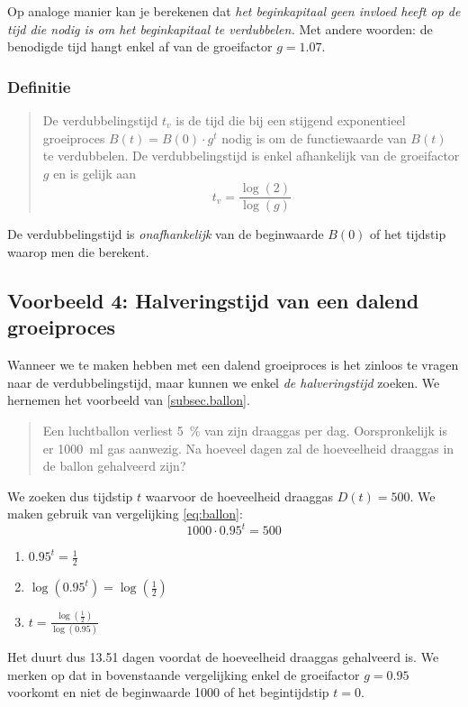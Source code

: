  Op analoge manier kan je berekenen dat \emph{het beginkapitaal geen invloed heeft op de tijd die nodig is om het beginkapitaal te verdubbelen.} Met andere woorden: de benodigde tijd hangt enkel af van de groeifactor $g=\num{1.07}$.
 
 \subsubsection{Definitie}
 \begin{quote}
 De verdubbelingstijd $t_v$ is de tijd die bij een stijgend exponentieel groeiproces $B(t)=B(0)\cdot g^t$ nodig is  om  de functiewaarde van $B(t)$ te verdubbelen.  De verdubbelingstijd is enkel afhankelijk van de groeifactor $g$ en is gelijk aan 
 \begin{displaymath}
     t_{v}=\frac{\log(2)}{\log(g)}
 \end{displaymath} 
 \end{quote}
 De verdubbelingstijd is \emph{onafhankelijk}
 van de beginwaarde $B(0)$ of het tijdstip waarop men die berekent. 



 \subsection[Dalend groeiproces: halveringstijd] {Voorbeeld 4: Halveringstijd van een dalend groeiproces}

 Wanneer we te maken hebben met een dalend groeiproces is het zinloos
 te vragen naar de verdubbelingstijd, maar kunnen we enkel \emph{de
  halveringstijd} zoeken.  We hernemen het voorbeeld van \cref{subsec.ballon}.
  \begin{quote}
  Een luchtballon verliest  \SI{5}{\percent} van zijn
 draaggas per dag. Oorspronkelijk is er \SI{1000}{\milli\litre} gas aanwezig.
     Na hoeveel dagen zal de hoeveelheid draaggas in de ballon gehalveerd zijn?
 \end{quote}
We zoeken dus tijdstip $t$ waarvoor de hoeveelheid draaggas $D(t)=500$. We maken gebruik van vergelijking \eqref{eq:ballon}:
\[
     1000\cdot \num{0.95}^{t} =  500  
     \]
     \begin{enumerate}
\item $\displaystyle      
     \num{0.95}^{t} =\frac{1}{2}$
     \addtocounter{enumi}{1}
\item $\displaystyle      
     \log(\num{0.95}^{t}) =  \log\left(\frac{1}{2}\right) $
\item $\displaystyle      
     t =  \frac{\log(\frac{1}{2})}{\log(\num{0.95})} \label{eq:th_draaggas}
$
     \end{enumerate}
     Het duurt dus  \num{13.51} dagen voordat de hoeveelheid draaggas gehalveerd is. We merken op dat in bovenstaande  vergelijking enkel de groeifactor $g=\num{0.95}$ voorkomt en niet de beginwaarde 1000 of het begintijdstip $t=0$.

